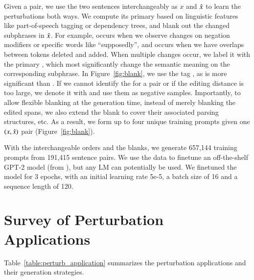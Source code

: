 Given a pair, we use the two sentences interchangeably as $x$ and $\hat{x}$ to learn the perturbations both ways.
We compute its primary \tagstr based on linguistic features like part-of-speech tagging or dependency trees, and blank out the changed subphrases in $\hat{x}$.
For example,  occurs when we observe changes on negation modifiers or specific words like ``supposedly'', and  occurs when we have overlaps between tokens deleted and added.
When multiple changes occur, we label it with the primary \tagstr, which most significantly change the semantic meaning on the corresponding subphrase.
In Figure~\ref{fig:blank}, we use the tag , as  is more significant than .
If we cannot identify the \tagstr for a pair or if the editing distance is too large, we denote it with \ctrltag{[global]} and use them as negative samples.
Importantly, to allow flexible blanking at the generation time, instead of merely blanking the edited spans, we also extend the blank to cover their associated parsing structures, etc.
As a result, we form up to four unique training prompts given one $(x, \hat{x})$ pair (Figure~\ref{fig:blank}).


With the interchangeable orders and the blanks, we generate 657,144 training prompts from 191,415 sentence pairs.
We use the data to finetune an off-the-shelf GPT-2 model (from \citet{Wolf2019HuggingFacesTS}), but any LM can potentially be used.
We finetuned the model for 3 epochs, with an initial learning rate 5e-5, a batch size of 16 and a sequence length of 120.




\section{Survey of Perturbation Applications}
\label{appendix:paper_survey}


Table~\ref{table:perturb_application} summarizes the perturbation applications and their generation strategies.
